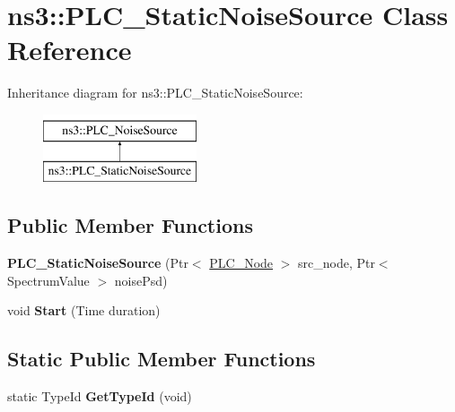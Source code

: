 \hypertarget{classns3_1_1PLC__StaticNoiseSource}{\section{ns3\-:\-:\-P\-L\-C\-\_\-\-Static\-Noise\-Source \-Class \-Reference}
\label{classns3_1_1PLC__StaticNoiseSource}
}
\-Inheritance diagram for ns3\-:\-:\-P\-L\-C\-\_\-\-Static\-Noise\-Source\-:\begin{figure}[H]
\begin{center}
\leavevmode
\includegraphics[height=2.000000cm]{classns3_1_1PLC__StaticNoiseSource}
\end{center}
\end{figure}
\subsection*{\-Public \-Member \-Functions}
\begin{DoxyCompactItemize}
\item 
\hypertarget{classns3_1_1PLC__StaticNoiseSource_a6ff8b14ea53478865d3718011960c8a4}{{\bfseries \-P\-L\-C\-\_\-\-Static\-Noise\-Source} (\-Ptr$<$ \hyperlink{classns3_1_1PLC__Node}{\-P\-L\-C\-\_\-\-Node} $>$ src\-\_\-node, \-Ptr$<$ \-Spectrum\-Value $>$ noise\-Psd)}\label{classns3_1_1PLC__StaticNoiseSource_a6ff8b14ea53478865d3718011960c8a4}

\item 
\hypertarget{classns3_1_1PLC__StaticNoiseSource_a2cdc9f92c961795126a7db193e929e6b}{void {\bfseries \-Start} (\-Time duration)}\label{classns3_1_1PLC__StaticNoiseSource_a2cdc9f92c961795126a7db193e929e6b}

\end{DoxyCompactItemize}
\subsection*{\-Static \-Public \-Member \-Functions}
\begin{DoxyCompactItemize}
\item 
\hypertarget{classns3_1_1PLC__StaticNoiseSource_a268a19f26e7f6c5d25782ffb2f7341a5}{static \-Type\-Id {\bfseries \-Get\-Type\-Id} (void)}\label{classns3_1_1PLC__StaticNoiseSource_a268a19f26e7f6c5d25782ffb2f7341a5}

\end{DoxyCompactItemize}
